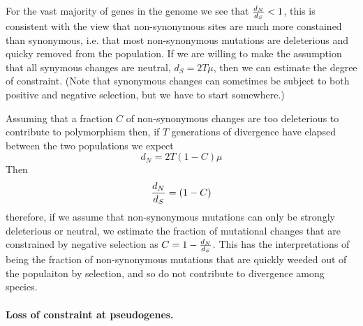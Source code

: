For the vast majority of genes in the genome we see that $\frac{d_N}{d_S} < 1$, this is consistent with the view
that non-synonymous sites are much more constained than synonymous,
i.e. that most non-synonymous mutations are deleterious and quicky
removed from the population. If we are willing to make the assumption that all synymous changes are
neutral, $d_S=2T \mu$, then we can estimate the degree of constraint. (Note that synonymous changes can sometimes be subject to
both positive and negative selection, but we have to start somewhere.) 

Assuming that a fraction $C$ of non-synonymous changes are too
deleterious to contribute to polymorphism then, if $T$ generations of divergence have
elapsed between the two populations we expect
\begin{equation}
d_N = 2T (1-C) \mu  
\end{equation}
Then
\begin{equation} 
\frac{d_N}{d_S} = (1-C) 
\end{equation}
therefore, if we assume that non-synonymous mutations can only be
strongly deleterious or neutral, we estimate the fraction of mutational changes that
are constrained by negative selection as $C= 1- \frac{d_N}{d_S}$. This has the
interpretations of being the fraction of non-synonymous mutations that
are quickly weeded out of the populaiton by selection, and so do not
contribute to divergence among species. 

\paragraph{Loss of constraint at pseudogenes.}

